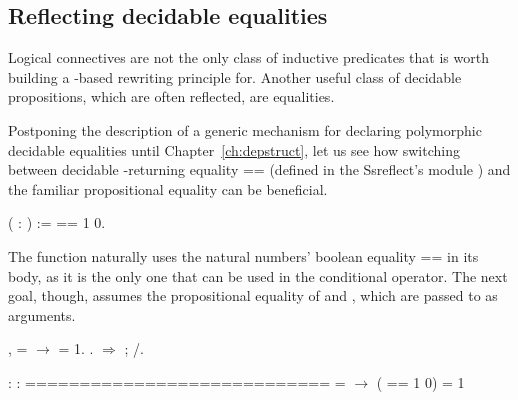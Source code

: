 \subsection{Reflecting decidable equalities}


\label{sec:eqrefl}


Logical connectives are not the only class of inductive predicates
that is worth building a -based rewriting principle for.
Another useful class of decidable propositions, which are often
reflected, are equalities.


Postponing the description of a generic mechanism for declaring
polymorphic decidable equalities until Chapter~\ref{ch:depstruct},
let us see how switching between decidable -returning equality
== (defined in the Ssreflect's module ) and
the familiar propositional equality can be beneficial.


\begin{coqdoccode}
\coqdocemptyline
\coqdocnoindent
{}  ( : ) :=   ==   1  0.\coqdoceol
\coqdocemptyline
\end{coqdoccode}


The function  naturally uses the natural numbers' boolean
equality == in its body, as it is the only one that can be used in
the conditional operator. The next goal, though, assumes the
propositional equality of  and , which are passed to  as
arguments.


\begin{coqdoccode}
\coqdocemptyline
\coqdocnoindent
{} \coqdockw{\ensuremath{\forall}}  ,  =  \ensuremath{\rightarrow}    = 1.\coqdoceol
\coqdocnoindent
{}.\coqdoceol
\coqdocnoindent
{}\ensuremath{\Rightarrow} ;  /.\coqdoceol
\coqdocemptyline
\end{coqdoccode}


\coqdoceol
\coqdocemptyline
\coqdocindent{1.00em}
 : \coqdoceol
\coqdocindent{1.00em}
 : \coqdoceol
\coqdocindent{1.00em}
============================\coqdoceol
\coqdocindent{1.50em}
 =  \ensuremath{\rightarrow} (  ==   1  0) = 1

